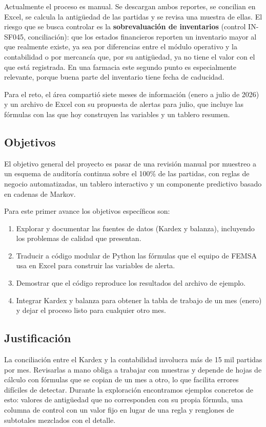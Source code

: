 \documentclass[11pt,letterpaper]{article}
\begin{document}
Actualmente el proceso es manual. Se descargan ambos reportes, se concilian en Excel, se calcula la antigüedad de las partidas y se revisa una muestra de ellas. El riesgo que se busca controlar es la \textbf{sobrevaluación de inventarios} (control IN-SF045, conciliación): que los estados financieros reporten un inventario mayor al que realmente existe, ya sea por diferencias entre el módulo operativo y la contabilidad o por mercancía que, por su antigüedad, ya no tiene el valor con el que está registrada. En una farmacia este segundo punto es especialmente relevante, porque buena parte del inventario tiene fecha de caducidad.

Para el reto, el área compartió siete meses de información (enero a julio de 2026) y un archivo de Excel con su propuesta de alertas para julio, que incluye las fórmulas con las que hoy construyen las variables y un tablero resumen.

\subsection{Objetivos}

El objetivo general del proyecto es pasar de una revisión manual por muestreo a un esquema de auditoría continua sobre el 100\% de las partidas, con reglas de negocio automatizadas, un tablero interactivo y un componente predictivo basado en cadenas de Markov.

Para este primer avance los objetivos específicos son:
\begin{enumerate}
  \item Explorar y documentar las fuentes de datos (Kardex y balanza), incluyendo los problemas de calidad que presentan.
  \item Traducir a código modular de Python las fórmulas que el equipo de FEMSA usa en Excel para construir las variables de alerta.
  \item Demostrar que el código reproduce los resultados del archivo de ejemplo.
  \item Integrar Kardex y balanza para obtener la tabla de trabajo de un mes (enero) y dejar el proceso listo para cualquier otro mes.
\end{enumerate}

\subsection{Justificación}

La conciliación entre el Kardex y la contabilidad involucra más de 15 mil partidas por mes. Revisarlas a mano obliga a trabajar con muestras y depende de hojas de cálculo con fórmulas que se copian de un mes a otro, lo que facilita errores difíciles de detectar. Durante la exploración encontramos ejemplos concretos de esto: valores de antigüedad que no corresponden con su propia fórmula, una columna de control con un valor fijo en lugar de una regla y renglones de subtotales mezclados con el detalle.
\end{document}
